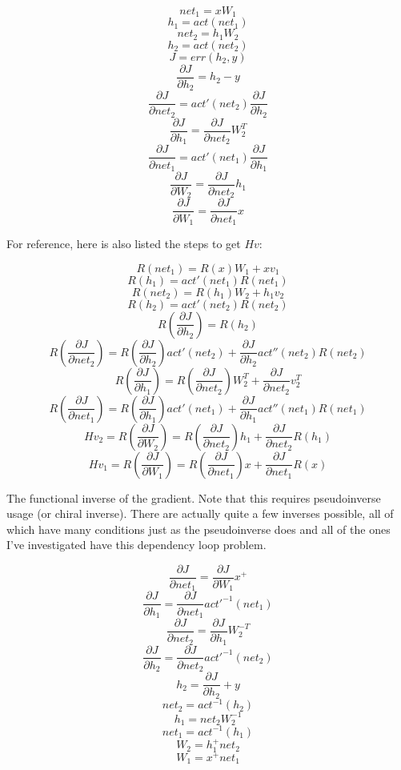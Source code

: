 \documentclass{article}
\begin{document}
$$ net_1 = xW_1 $$
$$ h_1 = act(net_1) $$
$$ net_2 = h_1W_2 $$
$$ h_2 = act(net_2) $$
$$ J = err(h_2, y) $$
$$ \frac{\partial J}{\partial h_2} = h_2 - y $$
$$ \frac{\partial J}{\partial net_2} = act'(net_2)\frac{\partial J}{\partial h_2}$$
$$ \frac{\partial J}{\partial h_1} = \frac{\partial J}{\partial net_2} W_2^T$$
$$ \frac{\partial J}{\partial net_1} = act'(net_1)\frac{\partial J}{\partial h_1}$$
$$ \frac{\partial J}{\partial W_2} = \frac{\partial J}{\partial net_2} h_1$$
$$ \frac{\partial J}{\partial W_1} = \frac{\partial J}{\partial net_1} x$$

For reference, here is also listed the steps to get $Hv$:

$$ R(net_1) = R(x)W_1 + xv_1 $$
$$ R(h_1) = act'(net_1)R(net_1) $$
$$ R(net_2) = R(h_1)W_2 + h_1v_2 $$
$$ R(h_2) = act'(net_2)R(net_2) $$
$$ R(\frac{\partial J}{\partial h_2}) = R(h_2) $$
$$ R(\frac{\partial J}{\partial net_2}) = R(\frac{\partial J}{\partial h_2}) act'(net_2) +
        \frac{\partial J}{\partial h_2} act''(net_2) R(net_2)$$
$$ R(\frac{\partial J}{\partial h_1}) = R(\frac{\partial J}{\partial net_2}) W_2^T + \frac{\partial J}{\partial net_2} v_2^T $$
$$ R(\frac{\partial J}{\partial net_1}) = R(\frac{\partial J}{\partial h_1}) act'(net_1) +
        \frac{\partial J}{\partial h_1} act''(net_1) R(net_1)$$
$$ Hv_2 = R(\frac{\partial J}{\partial W_2}) = R(\frac{\partial J}{\partial net_2}) h_1 + \frac{\partial J}{\partial net_2} R(h_1)$$
$$ Hv_1 = R(\frac{\partial J}{\partial W_1}) = R(\frac{\partial J}{\partial net_1}) x + \frac{\partial J}{\partial net_1} R(x)$$

The functional inverse of the gradient. Note that this requires pseudoinverse usage (or chiral inverse). There are actually quite a few inverses possible, all of which have many conditions just as the pseudoinverse does and all of the ones I've investigated have this dependency loop problem.

$$ \frac{\partial J}{\partial net_1} = \frac{\partial J}{\partial W_1} x^+$$
$$ \frac{\partial J}{\partial h_1} = \frac{\partial J}{\partial net_1} act'^{-1}(net_1)$$
$$ \frac{\partial J}{\partial net_2} = \frac{\partial J}{\partial h_1} W_2^{-T} $$
$$ \frac{\partial J}{\partial h_2} = \frac{\partial J}{\partial net_2} act'^{-1}(net_2)$$
$$ h_2 = \frac{\partial J}{\partial h_2} + y$$
$$ net_2 = act^{-1}(h_2)$$
$$ h_1 = net_2 W_2^{-1}$$
$$ net_1 = act^{-1}(h_1)$$
$$ W_2 = h_1^+ net_2$$
$$ W_1 = x^+ net_1$$
\end{document}
